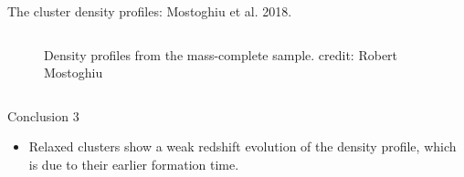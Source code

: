 \documentclass[aspectratio=43]{beamer}
\begin{document}
\begin{frame}{The cluster density profiles: Mostoghiu et al. 2018.}
\begin{columns}[t]
\begin{column}{0.7\textwidth}
{\begin{figure}
        \caption{Density profiles from the mass-complete sample. credit: Robert Mostoghiu}
      \end{figure}}
    \end{column}
  \end{columns}
\end{frame}
\begin{frame}{Conclusion 3}
 
  \begin{itemize}
    \item Relaxed clusters show a weak redshift evolution of the density profile, which is due to their earlier formation time.
  \end{itemize}
    \begin{center}
    \hyperlink{lastpage}{}    
  \end{center}
\end{frame}
\end{document}
